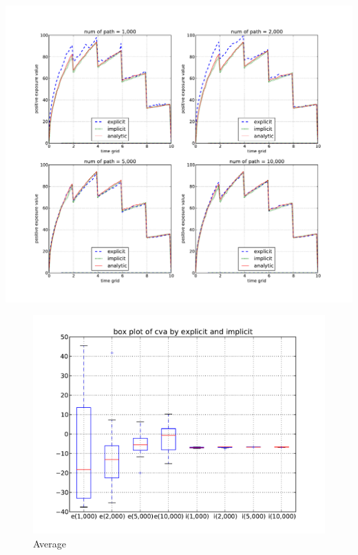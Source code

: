 \documentclass[12pt]{article}
\begin{document}
\begin{center}
\includegraphics[width=18cm]{exposureAll.pdf}
\end{center}

\begin{figure}[htbp]
\begin{center}
\includegraphics[width=12cm]{BoxplotCva.pdf}
\caption{Average} \label{fig1}
\end{center}
\end{figure} 
\end{document}
